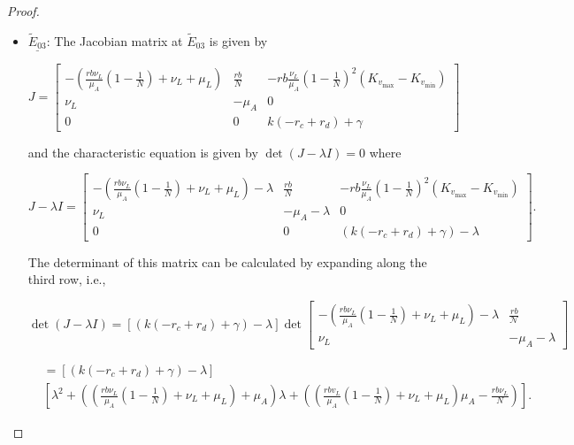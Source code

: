 \documentclass{article}
\theoremstyle{remark}
\theoremstyle{custom} %
\begin{document}
\begin{proof}
\begin{itemize}
Therefore, $E_{02}$ is LAS, confirming the stability conditions stated in item 2. Conversely, $E_{02}$ becomes unstable if $r_c-r_d>\frac{\gamma}{k}$, or $N>1$, since these conditions lead to at least one positive eigenvalue.


\item $\underline{\tilde{E}_{03}}$: The Jacobian matrix at ${\tilde{E}_{03}}$ is given by

$$
J=\left[\begin{array}{ccc}
-\left(\frac{r b \nu_L}{\mu_A}\left(1-\frac{1}{N}\right)+\nu_L+\mu_L\right) & \frac{r b}{N} & -r b \frac{\nu_L}{\mu_A}\left(1-\frac{1}{{N}}\right)^2\left(K_{v_{\max }}-K_{v_{\min }}\right) \\
\nu_L & -\mu_A & 0 \\
0 & 0 & k(- r_c+ r_d)+\gamma
\end{array}\right]
$$

and the characteristic equation is given by \(\det(J - \lambda I) = 0\) where

$$
J-\lambda I =\left[\begin{array}{ccc}
-\left(\frac{r b \nu_L}{\mu_A}\left(1-\frac{1}{N}\right)+\nu_L+\mu_L\right)-\lambda & \frac{r b}{N} & -r b \frac{\nu_L}{\mu_A}\left(1-\frac{1}{{N}}\right)^2\left(K_{v_{\max }}-K_{v_{\min }}\right) \\
\nu_L & -\mu_A-\lambda & 0 \\
0 & 0 &( k(- r_c+r_d)+\gamma)-\lambda
\end{array}\right].
$$

The determinant of this matrix can be calculated by expanding along the third row, i.e., 

$$
\operatorname{det}(J-\lambda I)=[( k(- r_c+r_d)+\gamma)-\lambda]\operatorname{det}\left[\begin{array}{cc}
-\left(\frac{r b \nu_L}{\mu_A}\left(1-\frac{1}{{N}}\right)+\nu_L+\mu_L\right)-\lambda & \frac{r b}{\mathcal{N}} \\
\nu_L & -\mu_A-\lambda
\end{array}\right]
$$


$$
\begin{aligned}
& =[( k(- r_c+r_d)+\gamma)-\lambda] \\
& {\left[\lambda^2+\left(\left(\frac{r b \nu_L}{\mu_A}\left(1-\frac{1}{{N}}\right)+\nu_L+\mu_L\right)+\mu_A\right) \lambda+\left(\left(\frac{r b v_L}{\mu_A}\left(1-\frac{1}{{N}}\right)+\nu_L+\mu_L\right) \mu_A-\frac{r b \nu_L}{{N}}\right)\right]}.
\end{aligned}
$$


\end{itemize}
\end{proof}
\end{document}
